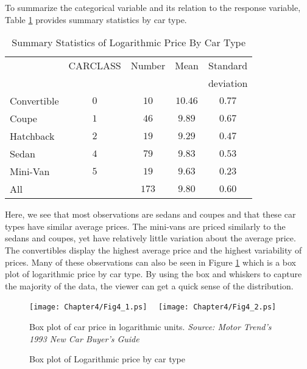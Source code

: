 To summarize the categorical variable and its relation to the
response variable, Table \ref{T4:CarPricebyType} provides summary
statistics by car type.

  \begin{center}  \begin{table}[h]
\caption{\label{T4:CarPricebyType} Summary Statistics of Logarithmic
Price By Car Type}
\begin{tabular}{lcccc}
\hline
& CARCLASS & Number & Mean & Standard \\
&  &  &  & deviation \\ \hline
Convertible & $0$ & $10$ & $10.46$ & $0.77$ \\
Coupe & $1$ & $46$ & $9.89$ & $0.67$ \\
Hatchback & $2$ & $19$ & $9.29$ & $0.47$ \\
Sedan & $4$ & $79$ & $9.83$ & $0.53$ \\
Mini-Van & $5$ & $19$ & $9.63$ & $0.23$ \\
All &  & $173$ & $9.80$ & $0.60$ \\ \hline
\end{tabular}
\end{table}  \end{center}  

\noindent Here, we see that most observations are sedans and coupes
and that these car types have similar average prices. The mini-vans
are priced similarly to the sedans and coupes, yet have relatively
little variation about the average price. The convertibles display
the highest average price and the highest variability of prices.
Many of these observations can also be seen in Figure
\ref{F4:CarPriceType} which is a box plot of logarithmic price by
car type. By using the box and whiskers to capture the majority of
the data, the viewer can get a quick sense of the distribution.

\begin{figure}[htp]
    \texttt{[image: Chapter4/Fig4\_1.ps]}
    $~~~$
    \texttt{[image: Chapter4/Fig4\_2.ps]}    \hfill
      \parbox[t]{2.5in}{\caption{\label{F4:CarPriceBox} \small  Box plot of car price in logarithmic units. \textit{Source: Motor Trend's
1993 New Car Buyer's Guide}}} \hfill
        \parbox[t]{2.5in}{ \caption{\label{F4:CarPriceType} \small  Box plot of Logarithmic price by car type}}
\end{figure}



